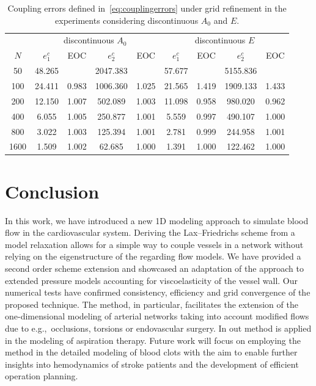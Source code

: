 \documentclass[a4paper,11pt]{article}
\begin{document}
\begin{table}
    \caption{Coupling errors defined in~\eqref{eq:couplingerrors} under grid refinement in the experiments considering discontinuous $A_0$ and $E$.}\label{tab:CplErrors} \vspace{.5em}
  \footnotesize
  \centering
  \begin{tabular}{c | c c c c | c c c c }
    &\multicolumn{4}{c|}{discontinuous $A_0$ } & \multicolumn{4}{c}{discontinuous $E$} \\
    $N$ & $e_1^c$ & EOC & $e_2^c$ & EOC & $e_1^c$ & EOC & $e_2^c$ & EOC\\
    \hline
    50 & 48.265 &  & 2047.383 &  & 57.677 &  & 5155.836 & \\ 
    100 & 24.411 & 0.983 & 1006.360 & 1.025 & 21.565 & 1.419 & 1909.133 & 1.433\\
    200 & 12.150 & 1.007 & 502.089 & 1.003 & 11.098 & 0.958 & 980.020 & 0.962\\
    400 & 6.055 & 1.005 & 250.877 & 1.001 & 5.559 & 0.997 & 490.107 & 1.000\\
    800 & 3.022 & 1.003 & 125.394 & 1.001 & 2.781& 0.999 & 244.958 & 1.001\\
    1600 & 1.509 & 1.002 & 62.685 & 1.000 & 1.391 & 1.000 & 122.462 & 1.000\\
  \end{tabular}

\end{table}

\section{Conclusion}
In this work, we have introduced a new 1D modeling approach to simulate blood flow in the cardiovascular system. Deriving the Lax--Friedrichs scheme from a model relaxation allows for a simple way to couple vessels in a network without relying on the eigenstructure of the regarding flow models. We have provided a second order scheme extension and showcased an adaptation of the approach to extended pressure models accounting for viscoelasticity of the vessel wall. Our numerical tests have confirmed consistency, efficiency and grid convergence of the proposed technique. The method, in particular, facilitates the extension of the one-dimensional modeling of arterial networks taking into account modified flows due to e.g.,\ occlusions, torsions or endovascular surgery. In \cite{herty2024} out method is applied in the modeling of aspiration therapy. Future work will focus on employing the method in the detailed modeling of blood clots with the aim to enable further insights into hemodynamics of stroke patients and the development of efficient operation planning.       
\end{document}
